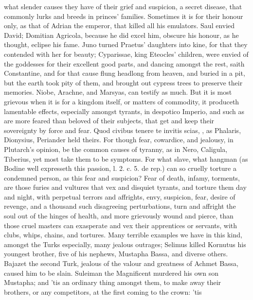 what slender causes they have of their grief and suspicion, a secret
disease, that commonly lurks and breeds in princes' families. Sometimes
it is for their honour only, as that of Adrian the emperor, that
killed all his emulators. Saul envied David; Domitian Agricola, because
he did excel him, obscure his honour, as he thought, eclipse his fame.
Juno turned Praetus' daughters into kine, for that they contended with
her for beauty; Cyparissae, king Eteocles' children, were envied
of the goddesses for their excellent good parts, and dancing amongst
the rest, saith Constantine, and for that cause flung headlong
from heaven, and buried in a pit, but the earth took pity of them, and
brought out cypress trees to preserve their memories. Niobe,
Arachne, and Marsyas, can testify as much. But it is most grievous when
it is for a kingdom itself, or matters of commodity, it produceth
lamentable effects, especially amongst tyrants, in despotico Imperio,
and such as are more feared than beloved of their subjects, that get
and keep their sovereignty by force and fear. Quod civibus tenere
te invitis scias, \etc{}, as Phalaris, Dionysius, Periander held theirs.
For though fear, cowardice, and jealousy, in Plutarch's opinion, be the
common causes of tyranny, as in Nero, Caligula, Tiberius, yet most take
them to be symptoms. For what slave, what hangman (as Bodine well
expresseth this passion, l. 2. c. 5. de rep.) can so cruelly torture a
condemned person, as this fear and suspicion? Fear of death, infamy,
torments, are those furies and vultures that vex and disquiet tyrants,
and torture them day and night, with perpetual terrors and affrights,
envy, suspicion, fear, desire of revenge, and a thousand such
disagreeing perturbations, turn and affright the soul out of the hinges
of health, and more grievously wound and pierce, than those cruel
masters can exasperate and vex their apprentices or servants, with
clubs, whips, chains, and tortures. Many terrible examples we have in
this kind, amongst the Turks especially, many jealous outrages;
Selimus killed Kornutus his youngest brother, five of his
nephews, Mustapha Bassa, and diverse others. Bajazet the second
Turk, jealous of the valour and greatness of Achmet Bassa, caused him
to be slain. Suleiman the Magnificent murdered his own son
Mustapha; and 'tis an ordinary thing amongst them, to make away their
brothers, or any competitors, at the first coming to the crown: 'tis
